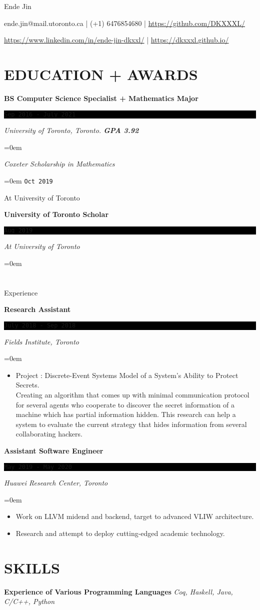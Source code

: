 \documentclass[fontsize=11pt]{article}
\newcommand{\MyName}[1]{ %
    \Huge \usefont{OT1}{phv}{b}{n} \hfill #1
    \par \normalsize \normalfont}
\newcommand{\NewPart}[1]{\section*{\uppercase{#1}}}
\newcommand{\SkillEntry}[2]{       %
    \noindent \textbf{#1} \hfill      %
        \noindent \textit{#2} \par        %
}
\newcommand{\EducationEntry}[4]{
    \noindent \textbf{#1} \hfill      %
    \colorbox{Black}{ 
      \parbox{11em}{
      \centering \color{White}#2}} \par  %
    \noindent \textit{#3} \par        %
    \noindent\hangindent=0em\hangafter=0 \small #4 %
    \normalsize \par}
\newcommand{\WorkEntry}[4]{       %
    \noindent \textbf{#1} \hfill      %
    \colorbox{Black}{%
      \parbox{11em}{%
      \centering\color{White}#2}} \par   %
        \noindent \textit{#3} \par        %
    \noindent\hangindent=0em\hangafter=0 \small #4 %
    \normalsize \par}
\begin{document}
    
\MyName{Ende Jin}
\bigskip
{\small \hfill {\large \faEnvelope} ende.jin@mail.utoronto.ca | {\large \faMobile} (+1) 6476854680 | {\large \faGithubSquare}  \url{https://github.com/DKXXXL/} \par
 \hfill {\large \faLinkedinSquare}  \url{https://www.linkedin.com/in/ende-jin-dkxxl/} | {\large \faWordpress} \url{https://dkxxxl.github.io/}}
\NewPart{Education + Awards}{}
\EducationEntry
{BS Computer Science Specialist + Mathematics Major}
{ \texttt{Sep 2016 - July 2021} }
{University of Toronto, Toronto.    \bf{GPA 3.92}}

\EducationEntry{Coxeter Scholarship in Mathematics}
{\texttt{Oct 2019}}{At University of Toronto}

\EducationEntry{University of Toronto Scholar}
{\texttt{Aug 2019}}{At University of Toronto}

\NewPart{Experience}{}

\WorkEntry
{Research Assistant}
{\texttt{July 2018 - Sep 2018}}
{Fields Institute, Toronto}
{\begin{itemize} \itemsep -1pt
    \item Project : Discrete-Event Systems Model of a System’s Ability to Protect Secrets. 
    \\ Creating an algorithm that comes up with minimal communication protocol for several agents who cooperate to discover the secret information of a machine which has partial information hidden. This research can help a system to evaluate the current strategy that hides information from several collaborating hackers.
    \end{itemize}}
    
\WorkEntry
{Assistant Software Engineer}
{\texttt{May 2019 - May 2020}}
{Huawei Research Center, Toronto}
{\begin{itemize} \itemsep -1pt
    \item Work on LLVM midend and backend, target to advanced VLIW architecture.
    \item Research and attempt to deploy cutting-edged academic technology.  
	\end{itemize}}
\NewPart{Skills}{}
\SkillEntry{Experience of Various Programming Languages}{Coq, Haskell, Java, C/C++, Python}
\end{document}
